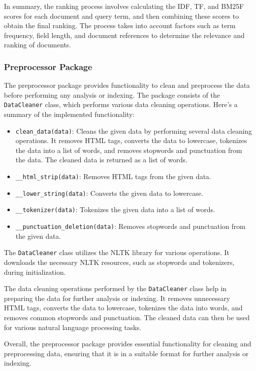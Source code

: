 \documentclass{article}
\begin{document}
In summary, the ranking process involves calculating the IDF, TF, and BM25F scores for each 
document and query term, and then combining these scores to obtain the final ranking. The 
process takes into account factors such as term frequency, field length, and document references 
to determine the relevance and ranking of documents.

\subsubsection{Preprocessor Package}

The preprocessor package provides functionality to clean and preprocess the data before 
performing any analysis or indexing. The package consists of the \texttt{DataCleaner} class, 
which performs various data cleaning operations. Here's a summary of the implemented 
functionality:

\begin{itemize}
    \item \texttt{clean\_data(data)}: Cleans the given data by performing several data cleaning 
    operations. It removes HTML tags, converts the data to lowercase, tokenizes the data into a 
    list of words, and removes stopwords and punctuation from the data. The cleaned data is 
    returned as a list of words.
    \item \texttt{\_\_html\_strip(data)}: Removes HTML tags from the given data.
    \item \texttt{\_\_lower\_string(data)}: Converts the given data to lowercase.
    \item \texttt{\_\_tokenizer(data)}: Tokenizes the given data into a list of words.
    \item \texttt{\_\_punctuation\_deletion(data)}: Removes stopwords and punctuation from the 
    given data.
\end{itemize}

The \texttt{DataCleaner} class utilizes the NLTK library for various operations. It downloads 
the necessary NLTK resources, such as stopwords and tokenizers, during initialization.

The data cleaning operations performed by the \texttt{DataCleaner} class help in preparing the 
data for further analysis or indexing. It removes unnecessary HTML tags, converts the data to 
lowercase, tokenizes the data into words, and removes common stopwords and punctuation. The 
cleaned data can then be used for various natural language processing tasks.

Overall, the preprocessor package provides essential functionality for cleaning and 
preprocessing data, ensuring that it is in a suitable format for further analysis or indexing.
\end{document}
